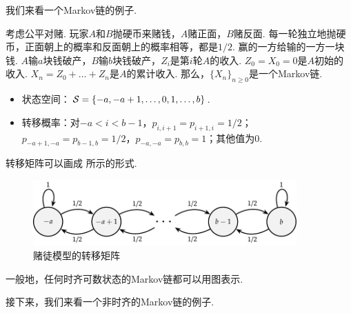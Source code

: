 我们来看一个Markov链的例子. 
\begin{example}[赌徒模型]
    考虑公平对赌. 玩家$A$和$B$抛硬币来赌钱，$A$赌正面，$B$赌反面. 每一轮独立地抛硬币，正面朝上的概率和反面朝上的概率相等，都是$1/2$. 赢的一方给输的一方一块钱. $A$输$a$块钱破产，$B$输$b$块钱破产，$Z_i$是第$i$轮$A$的收入. $Z_0=X_0=0$是$A$初始的收入. $X_n=Z_0+\dots+Z_n$是$A$的累计收入. 那么，$\{X_n\}_{n\geq 0}$是一个Markov链.
    \begin{itemize}
        \item 状态空间：$\mathcal S=\{-a,-a+1,\dots,0,1,\dots,b\}$.
        \item 转移概率：对$-a<i<b-1$，$p_{i,i+1}=p_{i+1,i}=1/2$；$p_{-a+1,-a}=p_{b-1,b}=1/2$，$p_{-a,-a}=p_{b,b}=1$；其他值为$0$.
    \end{itemize}
    转移矩阵可以画成 所示的形式.
    \begin{figure}[H]
    \centering
    \includegraphics[width=0.9\textwidth]{figures/Markov-chain/gampling.pdf}
    \caption{赌徒模型的转移矩阵}\label{fig:gambling}
    \end{figure}
    一般地，任何时齐可数状态的Markov链都可以用图表示.
\end{example}

接下来，我们来看一个非时齐的Markov链的例子.

